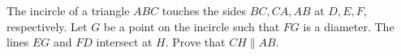 The incircle of a triangle $ABC$ touches the sides $BC,CA,AB$ at $D,E,F$,  respectively. Let $G$ be a point on the incircle such that $FG$ is a diameter. The lines $EG$ and $FD$ intersect at $H$. Prove that $CH\parallel AB$.